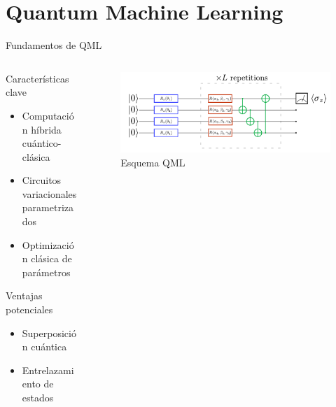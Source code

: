 \documentclass[aspectratio=43]{beamer}
\begin{document}
\section{Quantum Machine Learning}

\begin{frame}{Fundamentos de QML}
  \begin{columns}
    \begin{column}{0.5\textwidth}
      \begin{block}{Características clave}
        \begin{itemize}
          \item Computación híbrida cuántico-clásica
          \item Circuitos variacionales parametrizados
          \item Optimización clásica de parámetros
        \end{itemize}
      \end{block}
      \begin{alertblock}{Ventajas potenciales}
        \begin{itemize}
          \item Superposición cuántica
          \item Entrelazamiento de estados
        \end{itemize}
      \end{alertblock}
    \end{column}
    \begin{column}{0.5\textwidth}
      \begin{figure}
        \includegraphics[width=\textwidth]{angleemb.png}
        \caption{Esquema QML}
      \end{figure}
    \end{column}
  \end{columns}
\end{frame}
\end{document}
